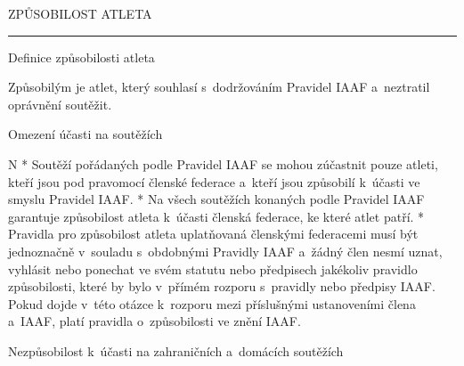 \chap ZPŮSOBILOST ATLETA

\rule{19}
\secc Definice způsobilosti atleta

Způsobilým je atlet, který souhlasí s~dodržováním Pravidel IAAF a~neztratil oprávnění soutěžit.

\secc Omezení  účasti na soutěžích

\begitems \style N
* Soutěží pořádaných podle Pravidel IAAF se mohou zúčastnit pouze atleti, kteří jsou pod pravomocí členské federace a~kteří jsou způsobilí k~účasti ve smyslu Pravidel IAAF.
* Na všech soutěžích konaných podle Pravidel IAAF garantuje způsobilost atleta k~účasti členská federace, ke které atlet patří.
* Pravidla pro způsobilost atleta uplatňovaná členskými federacemi musí být jednoznačně v~souladu s~obdobnými Pravidly IAAF a~žádný člen nesmí uznat, vyhlásit nebo ponechat ve svém statutu nebo předpisech jakékoliv pravidlo způsobilosti, které by bylo v~přímém rozporu s~pravidly nebo předpisy IAAF. Pokud dojde v~této otázce k~rozporu mezi příslušnými ustanoveními člena a~IAAF, platí pravidla o~způsobilosti ve znění IAAF.
\enditems

\secc Nezpůsobilost k~účasti na zahraničních a~domácích soutěžích

